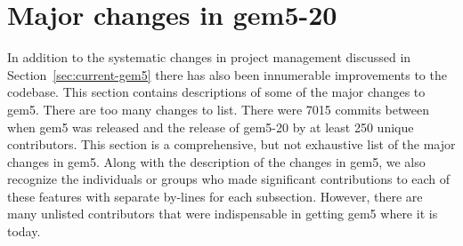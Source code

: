 \section{Major changes in gem5-20}
\label{sec:changes}

In addition to the systematic changes in project management discussed in Section~\ref{sec:current-gem5} there has also been innumerable improvements to the codebase.
This section contains descriptions of some of the major changes to gem5.
There are too many changes to list.
There were 7015 commits between when gem5 was released and the release of gem5-20 by at least 250 unique contributors.
This section is a comprehensive, but not exhaustive list of the major changes in gem5.
Along with the description of the changes in gem5, we also recognize the individuals or groups who made significant contributions to each of these features with separate by-lines for each subsection.
However, there are many unlisted contributors that were indispensable in getting gem5 where it is today.






% 



% 






%


% 













